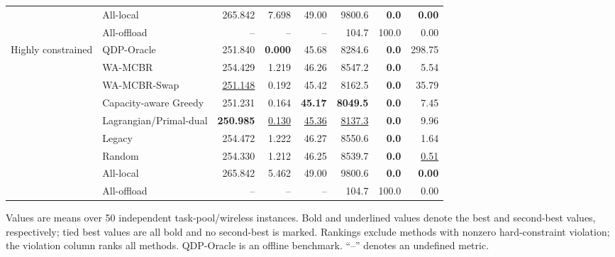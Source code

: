 \begin{table}[t]
\begin{tabular}{llrrrrrr}
 & All-local & 265.842 & 7.698 & 49.00 & 9800.6 & \textbf{0.0} & \textbf{0.00} \\
 & All-offload & -- & -- & -- & 104.7 & 100.0 & 0.00 \\
\midrule
Highly constrained & QDP-Oracle & 251.840 & \textbf{0.000} & 45.68 & 8284.6 & \textbf{0.0} & 298.75 \\
 & WA-MCBR & 254.429 & 1.219 & 46.26 & 8547.2 & \textbf{0.0} & 5.54 \\
 & WA-MCBR-Swap & \underline{251.148} & 0.192 & 45.42 & 8162.5 & \textbf{0.0} & 35.79 \\
 & Capacity-aware Greedy & 251.231 & 0.164 & \textbf{45.17} & \textbf{8049.5} & \textbf{0.0} & 7.45 \\
 & Lagrangian/Primal-dual & \textbf{250.985} & \underline{0.130} & \underline{45.36} & \underline{8137.3} & \textbf{0.0} & 9.96 \\
 & Legacy & 254.472 & 1.222 & 46.27 & 8550.6 & \textbf{0.0} & 1.64 \\
 & Random & 254.330 & 1.212 & 46.25 & 8539.7 & \textbf{0.0} & \underline{0.51} \\
 & All-local & 265.842 & 5.462 & 49.00 & 9800.6 & \textbf{0.0} & \textbf{0.00} \\
 & All-offload & -- & -- & -- & 104.7 & 100.0 & 0.00 \\
\bottomrule
\end{tabular}
\vspace{2pt}
\begin{minipage}{\textwidth}\footnotesize Values are means over 50 independent task-pool/wireless instances. Bold and underlined values denote the best and second-best values, respectively; tied best values are all bold and no second-best is marked. Rankings exclude methods with nonzero hard-constraint violation; the violation column ranks all methods. QDP-Oracle is an offline benchmark. ``--'' denotes an undefined metric.\end{minipage}
\end{table}
